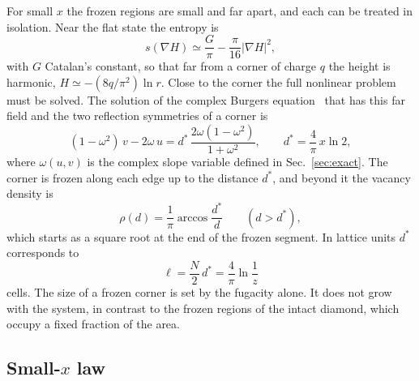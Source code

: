 \documentclass[reprint,aps,pre,superscriptaddress,longbibliography,floatfix,amsmath,amssymb]{revtex4-2}
\newcommand{\dst}{d^{*}}                 %
\begin{document}
For small $x$ the frozen regions are small and far apart, and each can be treated in isolation. Near the flat state the entropy is
\begin{equation}\label{eq:stiff}
  s(\nabla H)\simeq\frac{G}{\pi}-\frac{\pi}{16}|\nabla H|^2 ,
\end{equation}
with $G$ Catalan's constant, so that far from a corner of charge $q$ the height is harmonic, $H\simeq-(8q/\pi^2)\ln r$. Close to the corner the full nonlinear problem must be solved. The solution of the complex Burgers equation~\cite{kenyon2007} that has this far field and the two reflection symmetries of a corner is
\begin{equation}\label{eq:island}
  (1-\omega^2)\,v-2\omega\,u=\dst\,\frac{2\omega(1-\omega^2)}{1+\omega^2},\qquad \dst=\frac{4}{\pi}\,x\ln2 ,
\end{equation}
where $\omega(u,v)$ is the complex slope variable defined in Sec.~\ref{sec:exact}. The corner is frozen along each edge up to the distance $\dst$, and beyond it the vacancy density is
\begin{equation}\label{eq:rhoiso}
  \rho(d)=\frac1\pi\arccos\frac{\dst}{d}\qquad(d>\dst),
\end{equation}
which starts as a square root at the end of the frozen segment. In lattice units $\dst$ corresponds to
\begin{equation}\label{eq:ell}
  \ell=\frac{N}{2}\,\dst=\frac{4}{\pi}\ln\frac1z
\end{equation}
cells. The size of a frozen corner is set by the fugacity alone. It does not grow with the system, in contrast to the frozen regions of the intact diamond, which occupy a fixed fraction of the area.

\subsection{Small-$x$ law}
\end{document}

